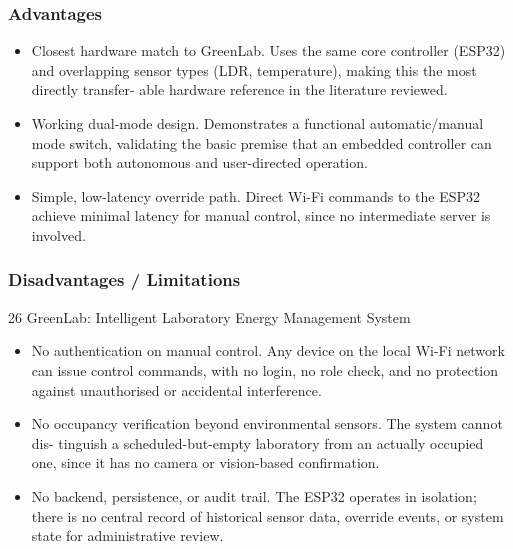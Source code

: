 \subsubsection*{Advantages}


\begin{itemize}
  \item Closest hardware match to GreenLab. Uses the same core controller (ESP32) and
overlapping sensor types (LDR, temperature), making this the most directly transfer-
able hardware reference in the literature reviewed.
\end{itemize}

\begin{itemize}
  \item Working dual-mode design. Demonstrates a functional automatic/manual mode
switch, validating the basic premise that an embedded controller can support both
autonomous and user-directed operation.
\end{itemize}

\begin{itemize}
  \item Simple, low-latency override path. Direct Wi-Fi commands to the ESP32 achieve
minimal latency for manual control, since no intermediate server is involved.
\end{itemize}



\subsubsection*{Disadvantages / Limitations}


26
GreenLab: Intelligent Laboratory Energy Management System


\begin{itemize}
  \item No authentication on manual control. Any device on the local Wi-Fi network can
issue control commands, with no login, no role check, and no protection against
unauthorised or accidental interference.
\end{itemize}

\begin{itemize}
  \item No occupancy veriﬁcation beyond environmental sensors. The system cannot dis-
tinguish a scheduled-but-empty laboratory from an actually occupied one, since it
has no camera or vision-based conﬁrmation.
\end{itemize}

\begin{itemize}
  \item No backend, persistence, or audit trail. The ESP32 operates in isolation; there
is no central record of historical sensor data, override events, or system state for
administrative review.
\end{itemize}



